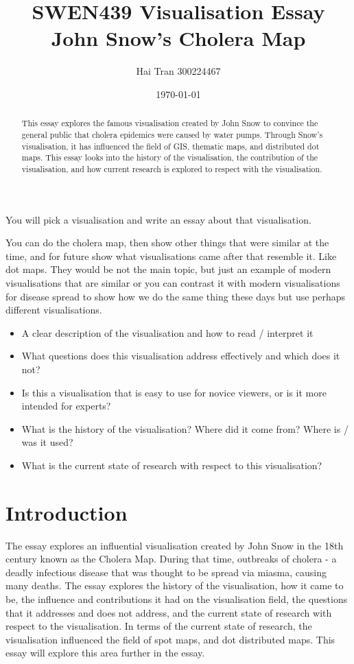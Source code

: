 \documentclass[12pt]{article}
\title{SWEN439 Visualisation Essay \\ John Snow's Cholera Map}
\author{Hai Tran 300224467}
\date{\today}
\begin{document}
\maketitle 

\begin{abstract}
This essay explores the famous visualisation created by John Snow to convince the general public that cholera epidemics were caused by water pumps. Through Snow's visualisation, it has influenced the field of GIS, thematic maps, and distributed dot maps. This essay looks into the history of the visualisation, the contribution of the visualisation, and how current research is explored to respect with the visualisation.

\end{abstract}

You will pick a visualisation and write an essay about that visualisation. 

You can do the cholera map, then show other things that were similar at the time, and for future show what visualisations came after that resemble it. Like dot maps. They would be not the main topic, but just an example of modern visualisations that are similar or you can contrast it with modern visualisations for disease spread to show how we do the same thing these days but use perhaps different visualisations.

\begin{itemize}
\item A clear description of the visualisation and how to read / interpret it
\item What questions does this visualisation address effectively and which does it not?
\item Is this a visualisation that is easy to use for novice viewers, or is it more intended for experts?
\item What is the history of the visualisation? Where did it come from? Where is / was it used?
\item What is the current state of research with respect to this visualisation?
\end{itemize}

\section{Introduction}

The essay explores an influential visualisation created by John Snow in the 18th century known as the Cholera Map. During that time, outbreaks of cholera - a deadly infectious disease that was thought to be spread via miasma, causing many deaths. The essay explores the history of the visualisation, how it came to be, the influence and contributions it had on the visualisation field, the questions that it addresses and does not address, and the current state of research with respect to the visualisation. In terms of the current state of research, the visualisation influenced the field of spot maps, and dot distributed maps. This essay will explore this area further in the essay.
\end{document}
